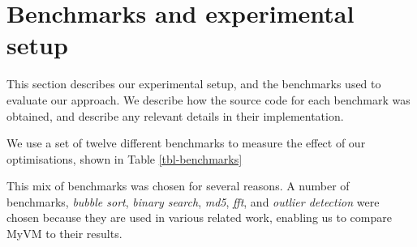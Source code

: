 \section{Benchmarks and experimental setup}
\label{sec-evaluation-benchmarks}
This section describes our experimental setup, and the benchmarks used to evaluate our approach. We describe how the source code for each benchmark was obtained, and describe any relevant details in their implementation.

We use a set of twelve different benchmarks to measure the effect of our optimisations, shown in Table \ref{tbl-benchmarks}



%
%

This mix of benchmarks was chosen for several reasons. A number of benchmarks, \emph{bubble sort}, \emph{binary search}, \emph{md5}, \emph{fft}, and \emph{outlier detection} were chosen because they are used in various related work, enabling us to compare MyVM to their results.

